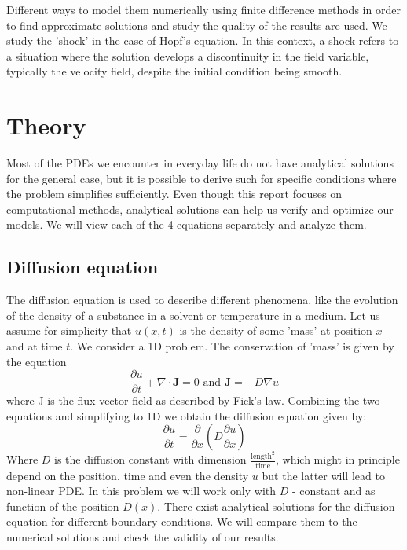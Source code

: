 \documentclass[5p,sort&compress]{elsarticle}
\numberwithin{equation}{subsection}
\begin{document}
Different ways to model them numerically using finite difference methods in order to find approximate solutions and study the quality of the results are used. We study the 'shock' in the case of Hopf's equation. In this context, a shock refers to a situation where the solution develops a discontinuity in the field variable, typically the velocity field, despite the initial condition being smooth. 

\section{Theory}
Most of the PDEs we encounter in everyday life do not have analytical solutions for the general case, but it is possible to derive such for specific conditions where the problem simplifies sufficiently. Even though this report focuses on computational methods, analytical solutions can help us verify and optimize our models. We will view each of the 4 equations separately and analyze them. 

\subsection{Diffusion equation}
The diffusion equation is used to describe different phenomena, like the evolution of the density of a substance in a solvent or temperature in a medium. Let us assume for simplicity that $u(x,t)$  is the density of some 'mass' at position $x$ and at time $t$. We consider a 1D problem.
The conservation of 'mass' is given by the equation
\begin{equation}
    \frac{\partial u}{\partial t} + \nabla \cdot \mathbf{J} = 0 \text{ and }    \mathbf{J} = -D \nabla u 
    \label{conservation_eq}
\end{equation}
where J is the flux vector field as described by Fick's law. Combining the two equations and simplifying to 1D we obtain the diffusion equation given by:
\begin{equation}
\frac{\partial u}{\partial t} = \frac{\partial}{\partial x} \left( D \frac{\partial u}{\partial x} \right)
\label{eq:diffusion}
\end{equation}
Where $D$ is the diffusion constant with dimension $ \frac{\text{length}^2}{\text{time}}$, which might in principle depend on the position,
time and even the density $u$ but the latter will lead to non-linear PDE. In this problem we will work only with $D$ - constant and as function of the position $D(x)$. There exist analytical solutions for the diffusion equation for different boundary conditions. We will compare them to the numerical solutions and check the validity of our results.
\end{document}
